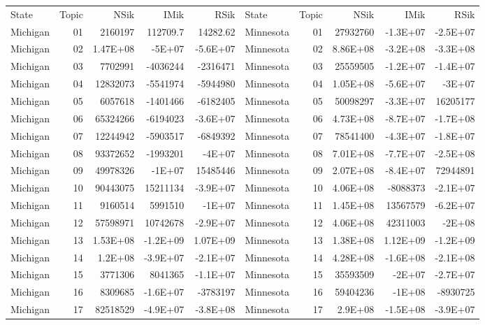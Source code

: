 \begin{table}[]
	\footnotesize
	\begin{tabular}{lrrrrlrrrr}
		State & Topic & NSik & IMik & RSik & State & Topic & NSik & IMik & RSik \\
		Michigan &  01  & 2160197 & 112709.7 & 14282.62 & Minnesota &  01  & 27932760 & -1.3E+07 & -2.5E+07 \\
		Michigan &  02  & 1.47E+08 & -5E+07 & -5.6E+07 & Minnesota &  02  & 8.86E+08 & -3.2E+08 & -3.3E+08 \\
		Michigan &  03  & 7702991 & -4036244 & -2316471 & Minnesota &  03  & 25559505 & -1.2E+07 & -1.4E+07 \\
		Michigan &  04  & 12832073 & -5541974 & -5944980 & Minnesota &  04  & 1.05E+08 & -5.6E+07 & -3E+07 \\
		Michigan &  05  & 6057618 & -1401466 & -6182405 & Minnesota &  05  & 50098297 & -3.3E+07 & 16205177 \\
		Michigan &  06  & 65324266 & -6194023 & -3.6E+07 & Minnesota &  06  & 4.73E+08 & -8.7E+07 & -1.7E+08 \\
		Michigan &  07  & 12244942 & -5903517 & -6849392 & Minnesota &  07  & 78541400 & -4.3E+07 & -1.8E+07 \\
		Michigan &  08  & 93372652 & -1993201 & -4E+07 & Minnesota &  08  & 7.01E+08 & -7.7E+07 & -2.5E+08 \\
		Michigan &  09  & 49978326 & -1E+07 & 15485446 & Minnesota &  09  & 2.07E+08 & -8.4E+07 & 72944891 \\
		Michigan &  10 & 90443075 & 15211134 & -3.9E+07 & Minnesota &  10 & 4.06E+08 & -8088373 & -2.1E+07 \\
		Michigan &  11 & 9160514 & 5991510 & -1E+07 & Minnesota &  11 & 1.45E+08 & 13567579 & -6.2E+07 \\
		Michigan &  12 & 57598971 & 10742678 & -2.9E+07 & Minnesota &  12 & 4.06E+08 & 42311003 & -2E+08 \\
		Michigan &  13 & 1.53E+08 & -1.2E+09 & 1.07E+09 & Minnesota &  13 & 1.38E+08 & 1.12E+09 & -1.2E+09 \\
		Michigan &  14 & 1.2E+08 & -3.9E+07 & -2.1E+07 & Minnesota &  14 & 4.28E+08 & -1.6E+08 & -2.1E+08 \\
		Michigan &  15 & 3771306 & 8041365 & -1.1E+07 & Minnesota &  15 & 35593509 & -2E+07 & -2.7E+07 \\
		Michigan &  16 & 8309685 & -1.6E+07 & -3783197 & Minnesota &  16 & 59404236 & -1E+08 & -8930725 \\
		Michigan &  17 & 82518529 & -4.9E+07 & -3.8E+08 & Minnesota &  17 & 2.9E+08 & -1.5E+08 & -3.9E+07 \\

\end{tabular}
\end{table}
